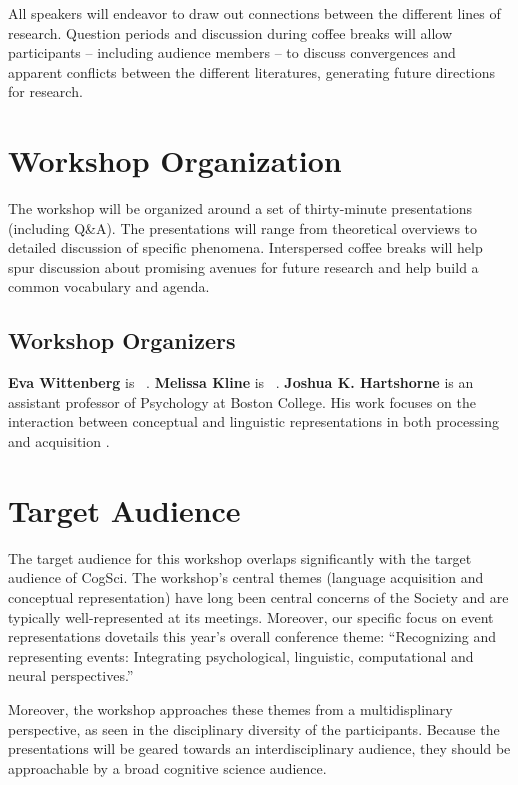 \documentclass[10pt,letterpaper]{article}
\newcommand{\jtodo}[2][]
{\todo[caption={#2}, size=\small, #1, color = orange, inline]{\renewcommand{\baselinestretch}{1}\selectfont \textbf{JH}: #2}~}
\begin{document}
All speakers will endeavor to draw out connections between the
different lines of research. Question periods and discussion during
coffee breaks will allow participants -- including audience members --
to discuss convergences and apparent conflicts between the different
literatures, generating future directions for research.

\section{Workshop Organization}

The workshop will be organized around a set of thirty-minute
presentations (including Q\&A). The presentations will range from
theoretical overviews to detailed discussion of specific
phenomena. Interspersed coffee breaks will help spur discussion about
promising avenues for future research and help build a common
vocabulary and agenda.

\subsection{Workshop Organizers}

\textbf{Eva Wittenberg} is \jtodo{Please blurb}. \textbf{Melissa Kline} is
\jtodo{please blurb}. \textbf{Joshua K. Hartshorne} is an assistant professor of
Psychology at Boston College. His work focuses on the interaction
between conceptual and linguistic representations in both processing
and acquisition \cite{HOSULS,HOT2015}.

\section{Target Audience}

The target audience for this workshop overlaps significantly
with the target audience of CogSci. The workshop's central themes
(language acquisition and conceptual representation) have long been
central concerns of the Society and are typically well-represented at
its meetings. Moreover, our specific focus on event representations
dovetails this year's overall conference theme: ``Recognizing and
representing events: Integrating psychological, linguistic,
computational and neural perspectives.''

Moreover, the workshop approaches these themes from a
multidisplinary perspective, as seen in the disciplinary diversity of
the participants. Because the presentations will be geared towards an
interdisciplinary audience, they should be approachable by a broad
cognitive science audience.
\end{document}
